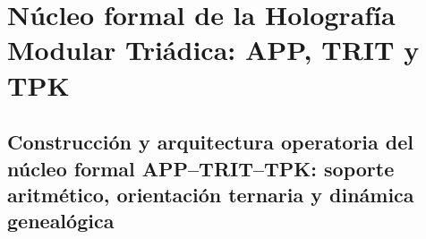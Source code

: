 %




\part{Núcleo formal de la Holografía Modular Triádica: APP, TRIT y TPK}

\chapter{Construcción y arquitectura operatoria del núcleo formal APP–TRIT–TPK: soporte aritmético, orientación ternaria y dinámica genealógica}
\label{chap:sucesor-102-01}







